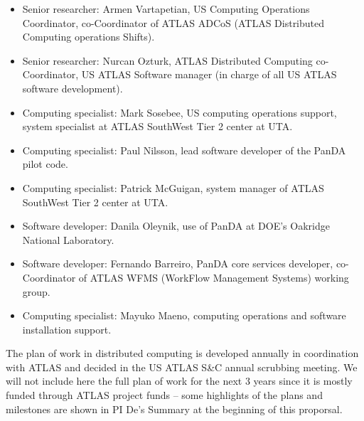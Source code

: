 \begin{itemize}[noitemsep,nolistsep]
    \item Senior researcher: Armen Vartapetian, US Computing Operations Coordinator, co-Coordinator of ATLAS ADCoS (ATLAS Distributed Computing operations Shifts).
    \item Senior researcher: Nurcan Ozturk, ATLAS Distributed Computing co-Coordinator, US ATLAS Software manager (in charge of all US ATLAS software development).
    \item Computing specialist: Mark Sosebee, US computing operations support, system specialist at ATLAS SouthWest Tier 2 center at UTA.
    \item Computing specialist: Paul Nilsson, lead software developer of the PanDA pilot code.
    \item Computing specialist: Patrick McGuigan, system manager of ATLAS SouthWest Tier 2 center at UTA.
    \item Software developer: Danila Oleynik, use of PanDA at DOE's Oakridge National Laboratory.
    \item Software developer: Fernando Barreiro, PanDA core services developer, co-Coordinator of ATLAS WFMS (WorkFlow Management Systems) working group.
    \item Computing specialist: Mayuko Maeno, computing operations and software installation support.
\end{itemize}

The plan of work in distributed computing is developed annually in coordination with ATLAS and decided in the US ATLAS S\&C annual scrubbing meeting. We will not include here the full plan of work for the next 3 years since it is mostly funded through ATLAS project funds -- some highlights of the plans and milestones are shown in PI De's Summary at the beginning of this proporsal.